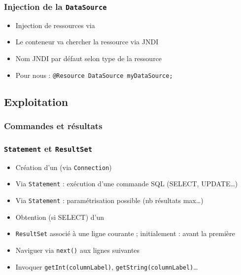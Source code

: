 \documentclass[english, french]{beamer}
\begin{document}
\begin{frame}
	\frametitle{Injection de la \texttt{DataSource}}
	\begin{itemize}
		\item Injection de ressources via 
		\item Le conteneur va chercher la ressource via JNDI
		\item Nom JNDI par défaut selon type de la ressource
		\item Pour nous : \texttt{@Resource DataSource myDataSource;}
	\end{itemize}
\end{frame}

\subsection{Exploitation}
\subsubsection{Commandes et résultats}
\begin{frame}
	\frametitle{\texttt{Statement} et \texttt{ResultSet}}
	\begin{itemize}
		\item Création d’un  (via \texttt{Connection})
		\item Via \texttt{Statement} : exécution d’une commande SQL (SELECT, UPDATE…)
		\item Via \texttt{Statement} : paramétrisation possible (nb résultats max…)
		\item Obtention (si SELECT) d’un 
		\item \texttt{ResultSet} associé à une ligne courante ; initialement : avant la première
		\item Naviguer via \texttt{next()} aux lignes suivantes
		\item Invoquer \texttt{getInt(columnLabel)}, \texttt{getString(columnLabel)}…
	\end{itemize}
\end{frame}
\end{document}
